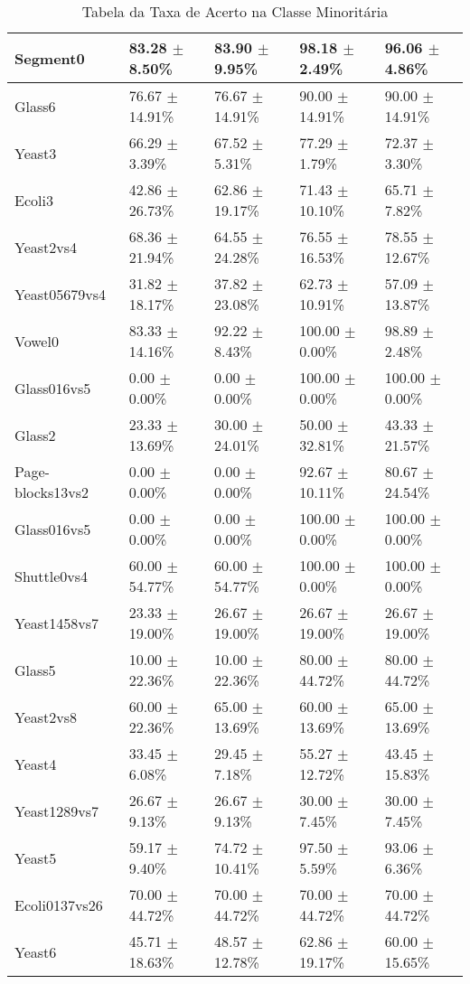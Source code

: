 \begin{table}[H]
\begin{center}
\begin{tabular}{|l|l|l|l|l|}
\hline
Segment0	&	83.28 $\pm$8.50\%	&	83.90 $\pm$9.95\%	&	98.18 $\pm$2.49\%	&	96.06 $\pm$4.86\%	\\
\hline
Glass6	&	76.67 $\pm$14.91\%	&	76.67 $\pm$14.91\%	&	90.00 $\pm$14.91\%	&	90.00 $\pm$14.91\%	\\
\hline
Yeast3	&	66.29 $\pm$3.39\%	&	67.52 $\pm$5.31\%	&	77.29 $\pm$1.79\%	&	72.37 $\pm$3.30\%	\\
\hline
Ecoli3	&	42.86 $\pm$26.73\%	&	62.86 $\pm$19.17\%	&	71.43 $\pm$10.10\%	&	65.71 $\pm$7.82\%	\\
\hline
Yeast2vs4	&	68.36 $\pm$21.94\%	&	64.55 $\pm$24.28\%	&	76.55 $\pm$16.53\%	&	78.55 $\pm$12.67\%	\\
\hline
Yeast05679vs4	&	31.82 $\pm$18.17\%	&	37.82 $\pm$23.08\%	&	62.73 $\pm$10.91\%	&	57.09 $\pm$13.87\%	\\
\hline
Vowel0	&	83.33 $\pm$14.16\%	&	92.22 $\pm$8.43\%	&	100.00 $\pm$0.00\%	&	98.89 $\pm$2.48\%	\\
\hline
Glass016vs5	&	0.00 $\pm$0.00\%	&	0.00 $\pm$0.00\%	&	100.00 $\pm$0.00\%	&	100.00 $\pm$0.00\%	\\
\hline
Glass2	&	23.33 $\pm$13.69\%	&	30.00 $\pm$24.01\%	&	50.00 $\pm$32.81\%	&	43.33 $\pm$21.57\%	\\
\hline
Page-blocks13vs2	&	0.00 $\pm$0.00\%	&	0.00 $\pm$0.00\%	&	92.67 $\pm$10.11\%	&	80.67 $\pm$24.54\%	\\
\hline
Glass016vs5	&	0.00 $\pm$0.00\%	&	0.00 $\pm$0.00\%	&	100.00 $\pm$0.00\%	&	100.00 $\pm$0.00\%	\\
\hline
Shuttle0vs4	&	60.00 $\pm$54.77\%	&	60.00 $\pm$54.77\%	&	100.00 $\pm$0.00\%	&	100.00 $\pm$0.00\%	\\
\hline
Yeast1458vs7	&	23.33 $\pm$19.00\%	&	26.67 $\pm$19.00\%	&	26.67 $\pm$19.00\%	&	26.67 $\pm$19.00\%	\\
\hline
Glass5	&	10.00 $\pm$22.36\%	&	10.00 $\pm$22.36\%	&	80.00 $\pm$44.72\%	&	80.00 $\pm$44.72\%	\\
\hline
Yeast2vs8	&	60.00 $\pm$22.36\%	&	65.00 $\pm$13.69\%	&	60.00 $\pm$13.69\%	&	65.00 $\pm$13.69\%	\\
\hline
Yeast4	&	33.45 $\pm$6.08\%	&	29.45 $\pm$7.18\%	&	55.27 $\pm$12.72\%	&	43.45 $\pm$15.83\%	\\
\hline
Yeast1289vs7	&	26.67 $\pm$9.13\%	&	26.67 $\pm$9.13\%	&	30.00 $\pm$7.45\%	&	30.00 $\pm$7.45\%	\\
\hline
Yeast5	&	59.17 $\pm$9.40\%	&	74.72 $\pm$10.41\%	&	97.50 $\pm$5.59\%	&	93.06 $\pm$6.36\%	\\
\hline
Ecoli0137vs26	&	70.00 $\pm$44.72\%	&	70.00 $\pm$44.72\%	&	70.00 $\pm$44.72\%	&	70.00 $\pm$44.72\%	\\
\hline
Yeast6	&	45.71 $\pm$18.63\%	&	48.57 $\pm$12.78\%	&	62.86 $\pm$19.17\%	&	60.00 $\pm$15.65\%	\\
\hline
\end{tabular}
\end{center}
\caption{Tabela da Taxa de Acerto na Classe Minoritária}
\label{tab:mintax}
\end{table}



